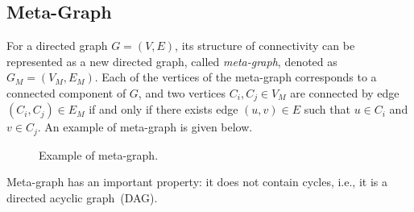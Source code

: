 
\subsection*{Meta-Graph}

For a directed graph $G = (V,E)$, its structure of connectivity can be represented as a new
directed graph, called \emph{meta-graph}, denoted as $G_M = (V_M, E_M)$.
Each of the vertices of the meta-graph corresponds to a connected component of $G$,
and two vertices $C_i, C_j  \in V_M$ are connected by edge $(C_i, C_j) \in E_M$
if and only if there exists edge $(u,v)\in E$ such that $u\in C_i$ and $v\in C_j$.
An example of meta-graph is given below.

\begin{figure}[h!]
\centering{}
\caption{Example of meta-graph.}
\label{fig:meta-graph}
\end{figure}

Meta-graph has an important property: it does not contain cycles, i.e., it is a directed acyclic graph~(DAG).

